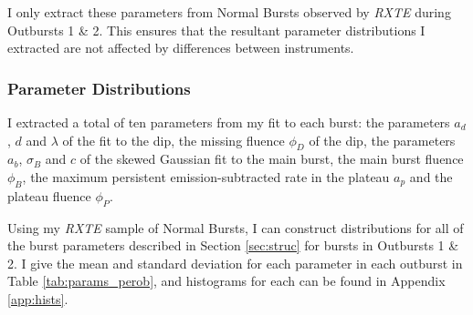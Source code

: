 \par I only extract these parameters from Normal Bursts observed by \textit{RXTE} during Outbursts 1 \& 2.  This ensures that the resultant parameter distributions I extracted are not affected by differences between instruments.

\subsubsection{Parameter Distributions}

\label{sec:hists}

\par I extracted a total of ten parameters from my fit to each burst: the parameters $a_d$, $d$ and $\lambda$ of the fit to the dip, the missing fluence $\phi_D$ of the dip, the parameters $a_b$, $\sigma_B$ and $c$ of the skewed Gaussian fit to the main burst, the main burst fluence $\phi_B$, the maximum persistent emission-subtracted rate in the plateau $a_p$ and the plateau fluence $\phi_P$.
\par Using my \textit{RXTE} sample of Normal Bursts, I can construct distributions for all of the burst parameters described in Section \ref{sec:struc} for bursts in Outbursts 1 \& 2.  I give the mean and standard deviation for each parameter in each outburst in Table \ref{tab:params_perob}, and histograms for each can be found in Appendix \ref{app:hists}.

